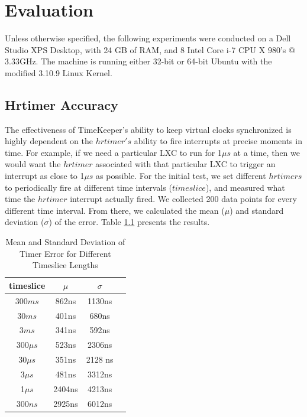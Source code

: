 \chapter{Evaluation} 
\label{chap:experiments}
Unless otherwise specified, the following experiments were conducted on a Dell Studio XPS Desktop, with 24 GB of RAM, and 8 Intel Core i-7 CPU X 980's @ 3.33GHz. The machine is running either 32-bit or 64-bit Ubuntu with the modified 3.10.9 Linux Kernel.

\section{Hrtimer Accuracy}
\label{sec:hrtimer}
The effectiveness of TimeKeeper's ability to keep virtual clocks synchronized is highly dependent on the $hrtimer's$ ability to fire interrupts at precise moments in time. For example, if we need a particular LXC to run for 1$\mu s$ at a time, then we would want the $hrtimer$ associated with that particular LXC to trigger an interrupt as close to 1$\mu s$ as possible. For the initial test, we set different $hrtimers$ to periodically fire at different time intervals ($timeslice$), and measured what time the $hrtimer$ interrupt actually fired. We collected 200 data points for every different time interval. From there, we calculated the mean ($\mu$) and standard deviation ($\sigma$) of the error. Table \ref{table:hrtimerAccuracy} presents the results.

\begin{table}\centering 
\begin{tabular}{|c|c|c|c|} 
        \hline 
        timeslice & $\mu$ & $\sigma$ \\ \hline 
        300$ms$ & 862ns &  1130ns \\ \hline 
        30$ms$ & 401ns &  680ns \\ \hline 
        3$ms$ & 341ns&  592ns \\ \hline 
        300$\mu s$ & 523ns &  2306ns \\ \hline 
        30$\mu s$ & 351ns &  2128 ns\\ \hline 
        3$\mu s$ & 481ns &  3312ns \\ \hline 
        1$\mu s$ & 2404ns &  4213ns \\ \hline 
        300$ns$ & 2925ns  & 6012ns \\ \hline 
        \hline 
        \end{tabular} 
        \caption{Mean and Standard Deviation of Timer Error for Different Timeslice Lengths} 
        \label{table:hrtimerAccuracy} 
\end{table}

